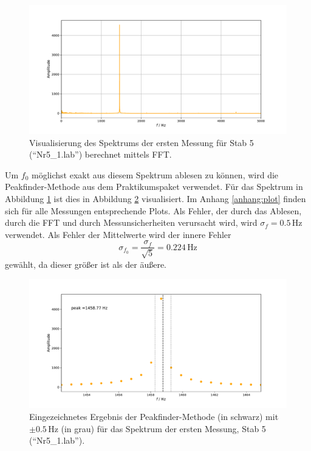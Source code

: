 \documentclass[a4paper, 12pt]{scrartcl}
\begin{document}
\begin{figure}[H]
	\centering
	\includegraphics[width=\linewidth]{plots/spektrum1.pdf}
	\caption{Visualisierung des Spektrums der ersten Messung für Stab 5 (\mbox{``Nr5\_1.lab''}) berechnet mittels FFT.}
	\label{pic:spektrum1}
\end{figure}

Um $f_0$ möglichst exakt aus diesem Spektrum ablesen zu können, wird die Peakfinder-Methode aus dem Praktikumspaket verwendet. Für das Spektrum in Abbildung \ref{pic:spektrum1} ist dies in Abbildung \ref{pic:spektrum2} visualisiert. Im Anhang \ref{anhang:plot} finden sich für alle Messungen entsprechende Plots. Als Fehler, der durch das Ablesen, durch die FFT und durch Messunsicherheiten verursacht wird, wird $\sigma_{f} = 0.5\,$Hz verwendet. Als Fehler der Mittelwerte wird der innere Fehler 
$$\sigma_{f_0} = \frac{\sigma_{f}}{\sqrt{5}} = 0.224\,\text{Hz}$$
gewählt, da dieser größer ist als der äußere.

\begin{figure}[H]
	\centering
	\includegraphics[width=\linewidth]{plots/spektrum2.pdf}
	\caption{Eingezeichnetes Ergebnis der Peakfinder-Methode (in schwarz) mit $\pm0.5\,$Hz (in grau) für das Spektrum der ersten Messung, Stab 5 (\mbox{``Nr5\_1.lab''}).}
	\label{pic:spektrum2}
\end{figure}
\end{document}
